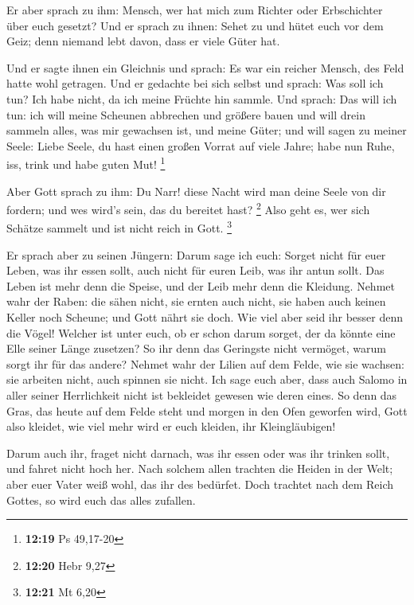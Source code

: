  Er aber sprach zu ihm: Mensch, wer hat mich zum Richter
oder Erbschichter über euch gesetzt?  Und er sprach zu
ihnen: Sehet zu und hütet euch vor dem Geiz; denn niemand lebt davon,
dass er viele Güter hat.

 Und er sagte ihnen ein Gleichnis und sprach: Es war ein
reicher Mensch, des Feld hatte wohl getragen.  Und er
gedachte bei sich selbst und sprach: Was soll ich tun? Ich habe nicht,
da ich meine Früchte hin sammle.  Und sprach: Das will ich
tun: ich will meine Scheunen abbrechen und größere bauen und will drein
sammeln alles, was mir gewachsen ist, und meine Güter;  und
will sagen zu meiner Seele: Liebe Seele, du hast einen großen Vorrat auf
viele Jahre; habe nun Ruhe, iss, trink und habe guten Mut! \footnote{\textbf{12:19}
  Ps 49,17-20}

 Aber Gott sprach zu ihm: Du Narr! diese Nacht wird man
deine Seele von dir fordern; und wes wird's sein, das du bereitet hast?
\footnote{\textbf{12:20} Hebr 9,27}  Also geht es, wer sich
Schätze sammelt und ist nicht reich in Gott. \footnote{\textbf{12:21} Mt
  6,20}

 Er sprach aber zu seinen Jüngern: Darum sage ich euch:
Sorget nicht für euer Leben, was ihr essen sollt, auch nicht für euren
Leib, was ihr antun sollt.  Das Leben ist mehr denn die
Speise, und der Leib mehr denn die Kleidung.  Nehmet wahr
der Raben: die sähen nicht, sie ernten auch nicht, sie haben auch keinen
Keller noch Scheune; und Gott nährt sie doch. Wie viel aber seid ihr
besser denn die Vögel!  Welcher ist unter euch, ob er schon
darum sorget, der da könnte eine Elle seiner Länge zusetzen?
 So ihr denn das Geringste nicht vermöget, warum sorgt ihr
für das andere?  Nehmet wahr der Lilien auf dem Felde, wie
sie wachsen: sie arbeiten nicht, auch spinnen sie nicht. Ich sage euch
aber, dass auch Salomo in aller seiner Herrlichkeit nicht ist bekleidet
gewesen wie deren eines.  So denn das Gras, das heute auf
dem Felde steht und morgen in den Ofen geworfen wird, Gott also kleidet,
wie viel mehr wird er euch kleiden, ihr Kleingläubigen!

 Darum auch ihr, fraget nicht darnach, was ihr essen oder
was ihr trinken sollt, und fahret nicht hoch her.  Nach
solchem allen trachten die Heiden in der Welt; aber euer Vater weiß
wohl, das ihr des bedürfet.  Doch trachtet nach dem Reich
Gottes, so wird euch das alles zufallen.


